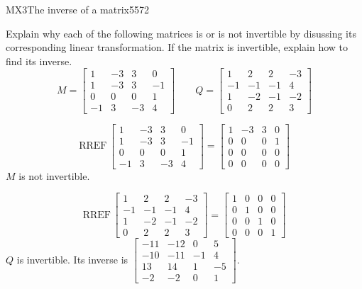 \begin{exercise}{MX3}{The inverse of a matrix}{5572} 
\begin{exerciseStatement} 

 Explain why each of the following matrices is or is not invertible by disussing its corresponding linear transformation. If the matrix is invertible, explain how to find its inverse. \[
\hspace{2em}
M = \left[\begin{array}{cccc}
1 & -3 & 3 & 0 \\
1 & -3 & 3 & -1 \\
0 & 0 & 0 & 1 \\
-1 & 3 & -3 & 4
\end{array}\right]
\hspace{2em}
Q = \left[\begin{array}{cccc}
1 & 2 & 2 & -3 \\
-1 & -1 & -1 & 4 \\
1 & -2 & -1 & -2 \\
0 & 2 & 2 & 3
\end{array}\right]
\hspace{2em}
        \] 

 \end{exerciseStatement}
 \begin{exerciseAnswer} 

 \[\mathrm{RREF}\,\left[\begin{array}{cccc}
1 & -3 & 3 & 0 \\
1 & -3 & 3 & -1 \\
0 & 0 & 0 & 1 \\
-1 & 3 & -3 & 4
\end{array}\right]=\left[\begin{array}{cccc}
1 & -3 & 3 & 0 \\
0 & 0 & 0 & 1 \\
0 & 0 & 0 & 0 \\
0 & 0 & 0 & 0
\end{array}\right]\] \(M\) is not invertible. 

 

 \[\mathrm{RREF}\,\left[\begin{array}{cccc}
1 & 2 & 2 & -3 \\
-1 & -1 & -1 & 4 \\
1 & -2 & -1 & -2 \\
0 & 2 & 2 & 3
\end{array}\right]=\left[\begin{array}{cccc}
1 & 0 & 0 & 0 \\
0 & 1 & 0 & 0 \\
0 & 0 & 1 & 0 \\
0 & 0 & 0 & 1
\end{array}\right]\] \(Q\) is invertible. Its inverse is \(\left[\begin{array}{cccc}
-11 & -12 & 0 & 5 \\
-10 & -11 & -1 & 4 \\
13 & 14 & 1 & -5 \\
-2 & -2 & 0 & 1
\end{array}\right]\). 

 \end{exerciseAnswer}
 \end{exercise}


